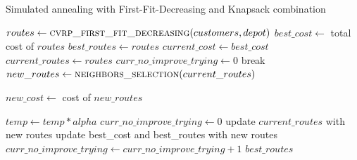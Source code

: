 \documentclass[12pt]{article}
\begin{document}
\begin{algorithm}[!h]
    \footnotesize
    \caption{Simulated annealing with First-Fit-Decreasing and Knapsack combination}
    \label{alg:alg_sa}
    
    \begin{algorithmic}[1]
        
        
        \State $routes \gets \textsc{cvrp\_first\_fit\_decreasing}(customers,depot)$
        \State $best\_cost \gets$ total cost of $routes$
        \State $best\_routes \gets routes$
        \State $current\_cost \gets best\_cost$
        \State $current\_routes \gets routes$
        \State $curr\_no\_improve\_trying \gets 0$
        break
        \EndIf
        \State $new\_routes \gets \textsc{neighbors\_selection}(current\_routes)$
        
        \State $new\_cost \gets$ cost of $new\_routes$
        
        \State $temp \gets temp * alpha$
        \State $curr\_no\_improve\_trying \gets 0$
        \State update $current\_routes$ with new routes
        \State update best\_cost and best\_routes with new routes
        \EndIf
        \Else
        \State $curr\_no\_improve\_trying \gets curr\_no\_improve\_trying + 1$
        \EndIf
        \EndWhile
        \Return $best\_routes$
        \EndFunction
    \end{algorithmic}
\end{algorithm}
\end{document}
